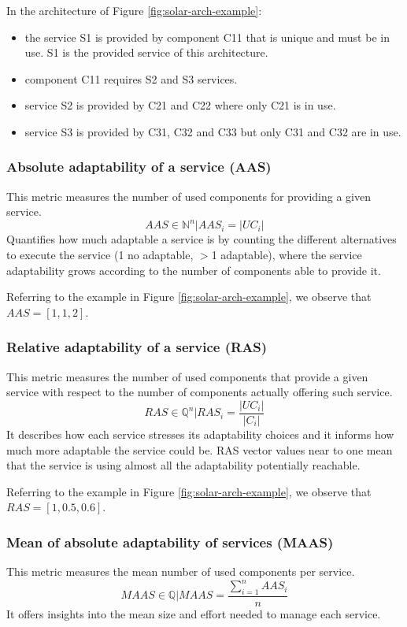 In the architecture of Figure \ref{fig:solar-arch-example}:
\begin{itemize}
	\item the service S1 is provided by component C11 that is unique and must be in use. S1 is the provided service of this architecture.
	\item component C11 requires S2 and S3 services.
	\item service S2 is provided by C21 and C22 where only C21 is in use.
	\item service S3 is provided by C31, C32 and C33 but only C31 and C32 are in use.
\end{itemize}

\subsubsection{Absolute adaptability of a service (AAS)}
This metric measures the number of used components for providing a given service.
\[ AAS \in \mathbb{N}^n |AAS_i = |UC_i|\]
Quantifies how much adaptable a service is by counting the different alternatives to execute the service (1 no adaptable, $>$1 adaptable), where the service adaptability grows according to the number of components able to provide it. 

\noindent Referring to the example in Figure \ref{fig:solar-arch-example}, we observe that $AAS = [1, 1, 2]$.

\subsubsection{Relative adaptability of a service (RAS)}
This metric measures the number of used components that provide a given service with respect to the number of components actually offering such service.
\[ RAS \in \mathbb{Q}^n | RAS_i = \frac{|UC_i|}{|C_i|} \]
It describes how each service stresses its adaptability choices and it informs how much more adaptable the service could be. RAS vector values near to one mean that the service is using almost all the adaptability potentially reachable. 

\noindent Referring to the example in Figure \ref{fig:solar-arch-example}, we observe that $RAS = [1, 0.5, 0.6]$.

\subsubsection{Mean of absolute adaptability of services (MAAS)}
This metric measures the mean number of used components per service.
\[ MAAS \in \mathbb{Q} | MAAS = \frac{\sum_{i=1}^{n} AAS_i}{n}  \]
It offers insights into the mean size and effort needed to manage each service.

